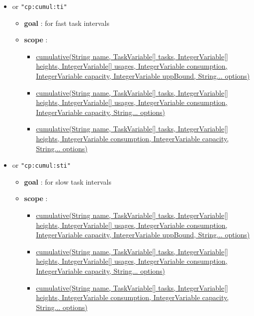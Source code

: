 \begin{itemize}
\begin{itemize}
\begin{itemize}
					\end{itemize}
		\end{itemize}
		\item \label{ccumulativeti:ccumulativetioptions}\hypertarget{ccumulativeti:ccumulativetioptions}{}		
		 or \texttt{"cp:cumul:ti"}
		\begin{itemize}
				\item \textbf{goal} : for fast task intervals
				\item \textbf{scope} :
					\begin{itemize}
						\item \hyperlink{cumulative:cumulativeconstraint}{cumulative(String name, TaskVariable[] tasks, IntegerVariable[] heights, IntegerVariable[] usages, IntegerVariable consumption, IntegerVariable capacity, IntegerVariable uppBound, String... options)}
						\item \hyperlink{cumulative:cumulativeconstraint}{cumulative(String name, TaskVariable[] tasks, IntegerVariable[] heights, IntegerVariable[] usages, IntegerVariable consumption, IntegerVariable capacity, String... options) }
						\item \hyperlink{cumulative:cumulativeconstraint}{cumulative(String name, TaskVariable[] tasks, IntegerVariable[] heights, IntegerVariable consumption, IntegerVariable capacity, String... options)}
					\end{itemize}
		\end{itemize}
		\item \label{ccumulativesti:ccumulativestioptions}\hypertarget{ccumulativesti:ccumulativestioptions}{}		
		 or \texttt{"cp:cumul:sti"}
		\begin{itemize}
				\item \textbf{goal} : for slow task intervals
				\item \textbf{scope} : 
					\begin{itemize}
						\item \hyperlink{cumulative:cumulativeconstraint}{cumulative(String name, TaskVariable[] tasks, IntegerVariable[] heights, IntegerVariable[] usages, IntegerVariable consumption, IntegerVariable capacity, IntegerVariable uppBound, String... options)}
						\item \hyperlink{cumulative:cumulativeconstraint}{cumulative(String name, TaskVariable[] tasks, IntegerVariable[] heights, IntegerVariable[] usages, IntegerVariable consumption, IntegerVariable capacity, String... options) }
						\item \hyperlink{cumulative:cumulativeconstraint}{cumulative(String name, TaskVariable[] tasks, IntegerVariable[] heights, IntegerVariable consumption, IntegerVariable capacity, String... options)}

\end{itemize}
\end{itemize}
\end{itemize}

